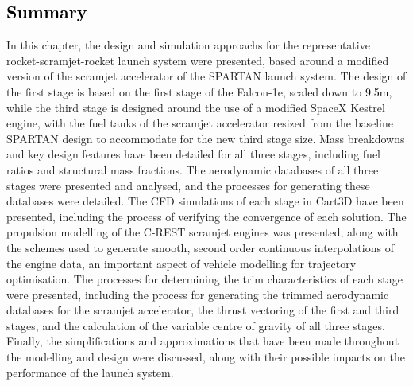 \textcolor{black}{
	\section{Summary}	
}
	
	\noindent
	In this chapter, the design and simulation approachs for the representative rocket-scramjet-rocket launch system were presented, based around a modified version of the scramjet accelerator of the SPARTAN launch system. 
	The design of the first stage is based on the first stage of the Falcon-1e, scaled down to \textcolor{black}{9.5m}, while the third stage is designed around the use of a modified SpaceX Kestrel engine, with the fuel tanks of the scramjet accelerator resized from the baseline SPARTAN design to accommodate for the new third stage size. 
	 Mass breakdowns and key design features have been detailed for all three stages, including fuel ratios and structural mass fractions.
	 The aerodynamic databases of all three stages were presented and analysed, and the processes for generating these databases were detailed. 
	 The CFD simulations of each stage in Cart3D have been presented, including the process of verifying the convergence of each solution. 
	 The propulsion modelling of the C-REST scramjet engines was presented, along with the schemes used to generate smooth, second order continuous interpolations of the engine data, an important aspect of vehicle modelling for trajectory optimisation. 
	The processes for determining the trim characteristics of each stage were presented, including the process for generating the trimmed aerodynamic databases for the scramjet accelerator, the thrust vectoring of the first and third stages, and the calculation of the variable centre of gravity of all three stages. Finally, the simplifications and approximations that have been made throughout the modelling and design were discussed, along with their possible impacts on the performance of the launch system.
	
	
